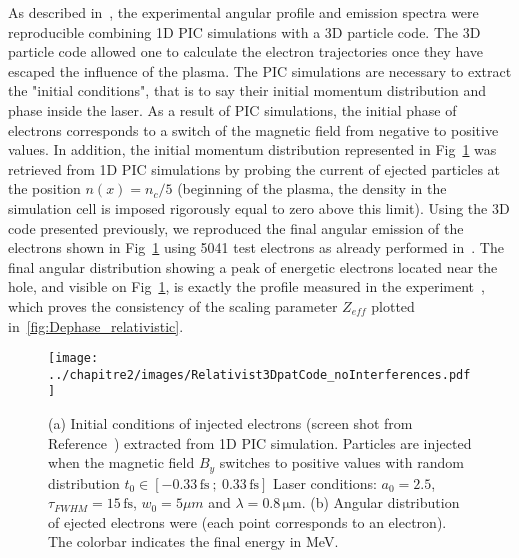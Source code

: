 \noindent As described in~\cite{thevenet2015}, the experimental angular profile and emission spectra were reproducible combining 1D PIC simulations with a 3D particle code. The 3D particle code allowed one to calculate the electron trajectories once they have escaped the influence of the plasma. The PIC simulations are necessary to extract the "initial conditions", that is to say their initial momentum distribution and phase inside the laser. As a result of PIC simulations, the initial phase of electrons corresponds to a switch of the magnetic field from negative to positive values. 
In addition, the initial momentum distribution represented in Fig~\ref{fig:Relativist3DpatCode_noInterferences} was retrieved from 1D PIC simulations by probing the current of ejected particles at the position $n(x) = n_c/5$ (beginning of the plasma, the density in the simulation cell is imposed rigorously equal to zero above this limit). Using the 3D code presented previously, we reproduced the final angular emission of the electrons shown in Fig~\ref{fig:Relativist3DpatCode_noInterferences} using 5041 test electrons as already performed in~\cite{thevenet2015}. The final angular distribution showing a peak of energetic electrons located near the hole, and visible on Fig~\ref{fig:Relativist3DpatCode_noInterferences}, is exactly the profile measured in the experiment~\cite{thevenet2015}, which proves the consistency of the scaling parameter $Z_{eff}$ plotted in~\ref{fig:Dephase_relativistic}.



\begin{figure}[H]
\begin{center}
\texttt{[image: ../chapitre2/images/Relativist3DpatCode\_noInterferences.pdf]}
\end{center}
\caption{\label{fig:Relativist3DpatCode_noInterferences} (a) Initial conditions of injected electrons (screen shot from Reference~\cite{thevenet2015}) extracted from 1D PIC simulation. Particles are injected when the magnetic field $B_y$ switches to positive values with random distribution $t_0\in [-0.33\,\mathrm{fs} \ ;\ 0.33\,\mathrm{fs}] $ Laser conditions: $a_0 = 2.5$, $\tau_{FWHM} = 15\,\mathrm{fs}$, $w_0 = 5\mu m$ and $\lambda = 0.8\,\mathrm{\mu m}$. (b) Angular distribution of ejected electrons were (each point corresponds to an electron). The colorbar indicates the final energy in MeV.}
\end{figure}
%






